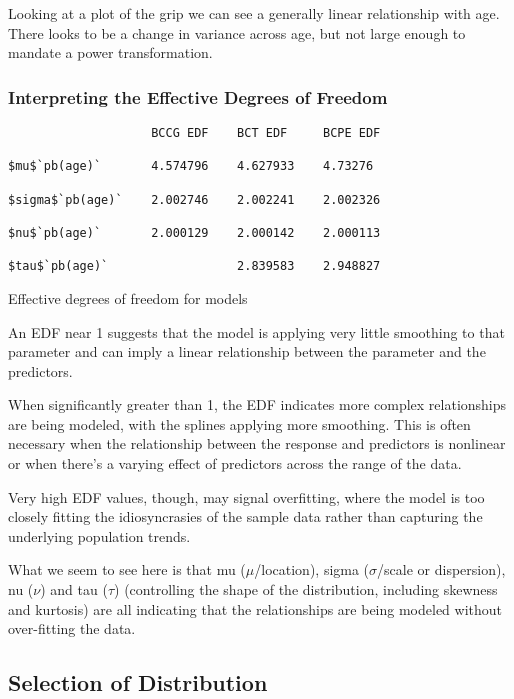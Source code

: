 Looking at a plot of the grip we can see a generally linear relationship with age. There looks to be a change in variance
across age, but not large enough to mandate a power transformation.

\subsubsection{Interpreting the Effective Degrees of Freedom}

\begin{table}[H]
\begin{verbatim}
                    BCCG EDF    BCT EDF     BCPE EDF

$mu$`pb(age)`       4.574796    4.627933    4.73276

$sigma$`pb(age)`    2.002746    2.002241    2.002326

$nu$`pb(age)`       2.000129    2.000142    2.000113

$tau$`pb(age)`                  2.839583    2.948827

\end{verbatim}
\caption {Effective degrees of freedom for models}
\end{table}

An EDF near 1 suggests that the model is applying very little smoothing to that parameter and can imply a linear relationship
between the parameter and the predictors.

When significantly greater than 1, the EDF indicates more complex relationships are being modeled, with the splines applying
more smoothing. This is often necessary when the relationship between the response and predictors is nonlinear or when there's
a varying effect of predictors across the range of the data.

Very high EDF values, though, may signal overfitting, where the model is too closely fitting the idiosyncrasies of the sample
data rather than capturing the underlying population trends.

What we seem to see here is that mu ($\mu$/location), sigma ($\sigma$/scale or dispersion), nu ($\nu$) and tau ($\tau$) (controlling
the shape of the distribution, including skewness and kurtosis) are all indicating that the relationships are being modeled
without over-fitting the data.


\subsection{Selection of Distribution}


